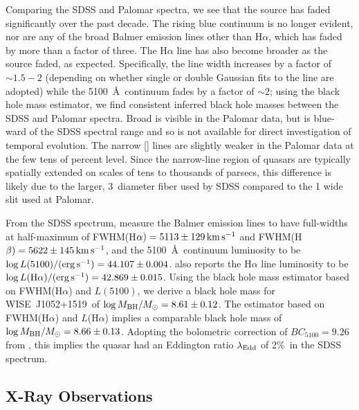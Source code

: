 \documentclass[iop]{emulateapj}
\def\qso{WISE~J1052+1519}
\begin{document}
Comparing the SDSS and Palomar spectra, we see that the source has
faded significantly over the past decade.  The rising blue continuum
is no longer evident, nor are any of the broad Balmer emission lines
other than H$\alpha$, which has faded by more than a factor of
three.  The H$\alpha$ line has also become broader as the
source faded, as expected.  Specifically, the line width increases
by a factor of $\sim 1.5-2$ (depending on whether single or double
Gaussian fits to the line are adopted) while the 5100~\AA\, continuum
fades by a factor of $\sim 2$; using the \citet{Jun:15a} black hole
mass estimator, we find consistent inferred black hole masses between
the SDSS and Palomar spectra. Broad  is visible in the
Palomar data, but is blue-ward of the SDSS spectral range and so
is not available for direct investigation of temporal evolution.
The narrow [] lines are slightly weaker in the Palomar
data at the few tens of percent level.  Since the narrow-line region
of quasars are typically spatially extended on scales of tens to
thousands of parsecs, this difference is likely due to the larger,
3\arcsec\ diameter fiber used by SDSS compared to the 1 wide
slit used at Palomar.

From the SDSS spectrum, \citet{Shen:11} measure the Balmer emission
lines to have full-widths at half-maximum of FWHM(H$\alpha) = 5113
\pm 129\, {\rm km}\, {\rm s}^{-1}$ and FWHM(H$\beta) = 5622 \pm
145\, {\rm km}\, {\rm s}^{-1}$, and the 5100~\AA\ continuum luminosity
to be $\log L(5100)/({\rm erg}\, {\rm s}^{-1}) = 44.107 \pm 0.004$.
\citet{Shen:11} also reports the H$\alpha$ line luminosity to be
$\log L({\rm H}\alpha)/({\rm erg}\, {\rm s}^{-1}) = 42.869 \pm
0.015$.  Using the \citet{Jun:15a} black hole mass estimator based
on FWHM(H$\alpha$) and $L(5100)$, we derive a black hole mass for
\qso\ of $\log M_{\rm BH}/M_\odot = 8.61 \pm 0.12$. The \citet{Jun:15a}
estimator based on FWHM(H$\alpha$) and $L$(H$\alpha$) implies a
comparable black hole mass of $\log M_{\rm BH}/M_\odot = 8.66 \pm
0.13$.  Adopting the bolometric correction of $BC_{5100} = 9.26$
from \citet{Shen:11}, this implies the quasar had an Eddington ratio
$\lambda_{\rm Edd}$ of 2\%\ in the SDSS spectrum.


\subsection{X-Ray Observations}
\end{document}
